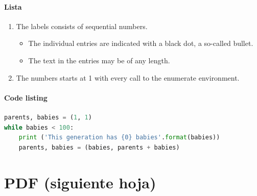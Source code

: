 \documentclass[12pt]{report} %
\begin{document}
\subsection{Lista}
\begin{enumerate}
	\item The labels consists of sequential numbers.
	      \begin{itemize}
		    \item The individual entries are indicated with a black dot, a so-called bullet.
		    \item The text in the entries may be of any length.
	    \end{itemize}
	\item The numbers starts at 1 with every call to the enumerate environment.
\end{enumerate}
 
\subsection{Code listing}
\begin{lstlisting}[language=Python]
parents, babies = (1, 1)
while babies < 100:
	print ('This generation has {0} babies'.format(babies))
	parents, babies = (babies, parents + babies)
\end{lstlisting}

\part{PDF (siguiente hoja)}

\end{document}
